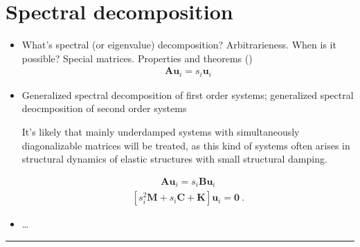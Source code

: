 \documentclass[letterpaper,10pt,english]{jupyterBook}
\begin{document}
\sphinxstepscope


\chapter{Spectral decomposition}
\label{\detokenize{ch/linear-algebra/spectral:spectral-decomposition}}\label{\detokenize{ch/linear-algebra/spectral:math-spectral}}\label{\detokenize{ch/linear-algebra/spectral::doc}}\begin{itemize}
\item {} 
\sphinxAtStartPar
{} What’s spectral (or eigenvalue) decomposition? Arbitrarieness. When is it possible? Special matrices. Properties and theorems ({\hyperref[\detokenize{ch/linear-algebra/cayley-hamilton:cayley-hamilton}]{}})
\begin{equation*}
\begin{split}\mathbf{A} \mathbf{u}_i = s_i \mathbf{u}_i\end{split}
\end{equation*}
\item {} 
\sphinxAtStartPar
{} Generalized spectral decomposition of first order systems; generalized spectral deocmposition of second order systems%
\begin{footnote}[1]\sphinxAtStartFootnote
It’s likely that mainly underdamped systems with simultaneously diagonalizable matrices will be treated, as this kind of systems often arises in structural dynamics of elastic structures with small structural damping.
%
\end{footnote}
\begin{equation*}
\begin{split}\mathbf{A} \mathbf{u}_i = s_i \mathbf{B} \mathbf{u}_i\end{split}
\end{equation*}\begin{equation*}
\begin{split}\left[ s_i^2 \mathbf{M}  + s_i \mathbf{C} + \mathbf{K} \right] \mathbf{u}_i = \mathbf{0} \ .\end{split}
\end{equation*}
\item {} 
\sphinxAtStartPar
{} …

\end{itemize}


\bigskip\hrule\bigskip
\end{document}
